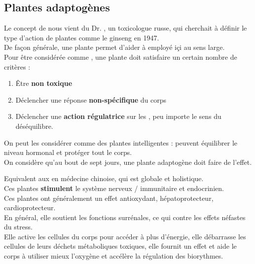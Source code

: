 \subsection{Plantes adaptogènes}

\begin{Defi}

    Le concept de  nous vient du Dr. , un toxicologue russe, 
    qui cherchait à définir le type d'action de plantes comme le ginseng en 1947.\\

    De façon générale, une plante  permet d'aider à  employé içi au sens large.\\

    Pour être considérée comme , une plante doit satisfaire un certain nombre de critères :
    \begin{enumerate}
        \item Être \textbf{non toxique}
        \item Déclencher une réponse \textbf{non-spécifique} du corps
        \item Déclencher une \textbf{action régulatrice} sur les , peu importe le sens du déséquilibre.
    \end{enumerate} 
    On peut les considérer comme des plantes intelligentes : peuvent équilibrer le niveau hormonal et protéger tout le corps.\\

    On considère qu'au bout de sept jours, une plante adaptogène doit faire de l'effet. 

    
\end{Defi}

\begin{Remarque}
    Equivalent aux  en médecine chinoise, qui est globale et holistique.\\
    Ces plantes \textbf{stimulent} le système nerveux / immunitaire et endocrinien.\\
    Ces plantes ont généralement un effet antioxydant, hépatoprotecteur, cardioprotecteur.\\
    En général, elle soutient les fonctions surrénales, ce qui contre les effets néfastes du stress.\\
    Elle active les cellules du corps pour accéder à plus d'énergie, elle débarrasse les cellules de leurs déchets métaboliques toxiques, 
    elle fournit un effet  
    et aide le corps à utiliser mieux l'oxygène et accélère la régulation des biorythmes.\\

\end{Remarque}

